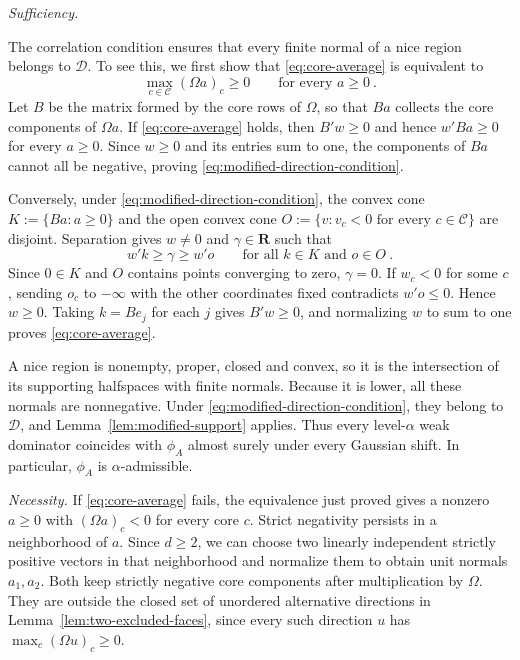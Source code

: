 \documentclass[11pt]{article}
\newcommand{\red}[1]{{\color{red}#1}} %
\numberwithin{equation}{section}
\theoremstyle{definition}
\begin{document}
{\red{\noindent\emph{Sufficiency.}}

The correlation condition ensures that every finite normal of a nice region belongs to $\mathcal D$. To see this, we first show that \eqref{eq:core-average} is equivalent to
\begin{equation}\label{eq:modified-direction-condition}
\max_{c\in\mathcal C}(\Omega a)_c\ge0\qquad\text{for every }a\ge0~.
\end{equation}
Let $B$ be the matrix formed by the core rows of $\Omega$, so that $Ba$ collects the core components of $\Omega a$. If \eqref{eq:core-average} holds, then $B'w\ge0$ and hence $w'Ba\ge0$ for every $a\ge0$. Since $w\ge0$ and its entries sum to one, the components of $Ba$ cannot all be negative, proving \eqref{eq:modified-direction-condition}.

Conversely, under \eqref{eq:modified-direction-condition}, the convex cone $K:=\{Ba:a\ge0\}$ and the open convex cone $O:=\{v:v_c<0\text{ for every }c\in\mathcal C\}$ are disjoint. Separation gives $w\ne0$ and $\gamma\in\mathbf R$ such that
\[
w'k\ge\gamma\ge w'o\qquad\text{for all }k\in K\text{ and }o\in O~.
\]
Since $0\in K$ and $O$ contains points converging to zero, $\gamma=0$. If $w_c<0$ for some $c$, sending $o_c$ to $-\infty$ with the other coordinates fixed contradicts $w'o\le0$. Hence $w\ge0$. Taking $k=Be_j$ for each $j$ gives $B'w\ge0$, and normalizing $w$ to sum to one proves \eqref{eq:core-average}.

A nice region is nonempty, proper, closed and convex, so it is the intersection of its supporting halfspaces with finite normals. Because it is lower, all these normals are nonnegative. Under \eqref{eq:modified-direction-condition}, they belong to $\mathcal D$, and Lemma~\ref{lem:modified-support} applies. Thus every level-$\alpha$ weak dominator coincides with $\phi_A$ almost surely under every Gaussian shift. In particular, $\phi_A$ is $\alpha$-admissible.

\red{\noindent\emph{Necessity.}
If \eqref{eq:core-average} fails, the equivalence just proved gives a nonzero $a\ge0$ with $(\Omega a)_c<0$ for every core $c$. Strict negativity persists in a neighborhood of $a$. Since $d\ge2$, we can choose two linearly independent strictly positive vectors in that neighborhood and normalize them to obtain unit normals $a_1,a_2$. Both keep strictly negative core components after multiplication by $\Omega$. They are outside the closed set of unordered alternative directions in Lemma~\ref{lem:two-excluded-faces}, since every such direction $u$ has $\max_c(\Omega u)_c\ge0$.

}}
\end{document}
